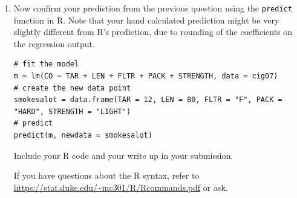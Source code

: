 \documentclass[11pt]{article}
\begin{document}
\begin{enumerate}[resume]
\item Now confirm your prediction from the previous question using the \texttt{predict} function in R. Note that your hand calculated prediction might be very slightly different from R's prediction, due to rounding of the coefficients on the regression output.
\begin{verbatim}
# fit the model
m = lm(CO ~ TAR + LEN + FLTR + PACK + STRENGTH, data = cig07)
# create the new data point
smokesalot = data.frame(TAR = 12, LEN = 80, FLTR = "F", PACK = "HARD", STRENGTH = "LIGHT")
# predict
predict(m, newdata = smokesalot)
\end{verbatim}

Include your R code and your write up in your submission. 

If you have questions about the R syntax, refer to \url{https://stat.duke.edu/~mc301/R/Rcommands.pdf} or ask.

 \end{enumerate}

%
\end{document}
